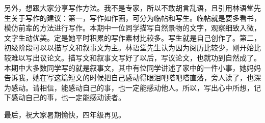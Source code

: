 另外，想跟大家分享写作方法。我不是专家，所以不敢胡言乱语，且引用林语堂先生关于写作的建议：第一，写作如作画，可分为临帖和写生。临帖就是要多看书，模仿前辈的方法进行写作。本期中一位同学描写自然景物的文字，观察细致入微，文字生动优美。定是她平时积累的写作素材比较多。写生就是自己创作了。第二，初级阶段可以以描写文和叙事文为主。林语堂先生认为因为阅历比较少，刚开始比较难以写出议论文。描写文和叙事文写好了以后，写议论文，也就功到自然成了。本期中大多数同学写的就是叙事文，其中有位同学讲述了家中的一件小事，她妈妈告诉我，她在写这篇短文的时候把自己感动得眼泪吧嗒吧嗒直落，旁人读了，也深为感动。请相信，能感动自己的事，也一定能感动他人。所以，写出心中所想，记下感动自己的事，也一定能感动读者。

最后，祝大家暑期愉快，四年级再见。
